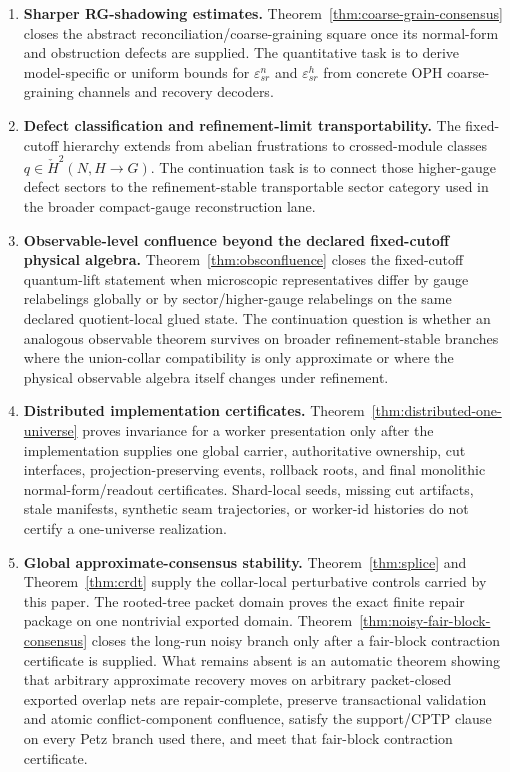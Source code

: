 \documentclass[11pt]{article}
\theoremstyle{remark}
\theoremstyle{plain}
\begin{document}
\begin{enumerate}
\item \textbf{Sharper RG-shadowing estimates.} Theorem~\ref{thm:coarse-grain-consensus} closes the abstract reconciliation/coarse-graining square once its normal-form and obstruction defects are supplied. The quantitative task is to derive model-specific or uniform bounds for \(\varepsilon^n_{sr}\) and \(\varepsilon^h_{sr}\) from concrete OPH coarse-graining channels and recovery decoders.

\item \textbf{Defect classification and refinement-limit transportability.} The fixed-cutoff hierarchy extends from abelian frustrations to crossed-module classes \(q\in \check H^2(N,H\to G)\). The continuation task is to connect those higher-gauge defect sectors to the refinement-stable transportable sector category used in the broader compact-gauge reconstruction lane.

\item \textbf{Observable-level confluence beyond the declared fixed-cutoff physical algebra.} Theorem~\ref{thm:obsconfluence} closes the fixed-cutoff quantum-lift statement when microscopic representatives differ by gauge relabelings globally or by sector/higher-gauge relabelings on the same declared quotient-local glued state. The continuation question is whether an analogous observable theorem survives on broader refinement-stable branches where the union-collar compatibility is only approximate or where the physical observable algebra itself changes under refinement.

\item \textbf{Distributed implementation certificates.} Theorem~\ref{thm:distributed-one-universe} proves invariance for a worker presentation only after the implementation supplies one global carrier, authoritative ownership, cut interfaces, projection-preserving events, rollback roots, and final monolithic normal-form/readout certificates. Shard-local seeds, missing cut artifacts, stale manifests, synthetic seam trajectories, or worker-id histories do not certify a one-universe realization.

\item \textbf{Global approximate-consensus stability.} Theorem~\ref{thm:splice} and Theorem~\ref{thm:crdt} supply the collar-local perturbative controls carried by this paper. The rooted-tree packet domain proves the exact finite repair package on one nontrivial exported domain. Theorem~\ref{thm:noisy-fair-block-consensus} closes the long-run noisy branch only after a fair-block contraction certificate is supplied. What remains absent is an automatic theorem showing that arbitrary approximate recovery moves on arbitrary packet-closed exported overlap nets are repair-complete, preserve transactional validation and atomic conflict-component confluence, satisfy the support/CPTP clause on every Petz branch used there, and meet that fair-block contraction certificate.


\end{enumerate}
\end{document}

